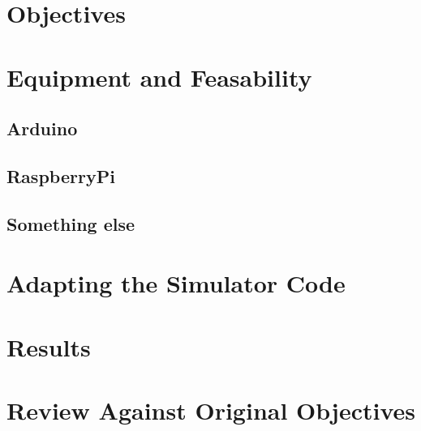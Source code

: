 \section{Objectives}
\section{Equipment and Feasability}
	\subsection{Arduino}
	\subsection{RaspberryPi}
	\subsection{Something else}
\section{Adapting the Simulator Code}
\section{Results}
\section{Review Against Original Objectives}
